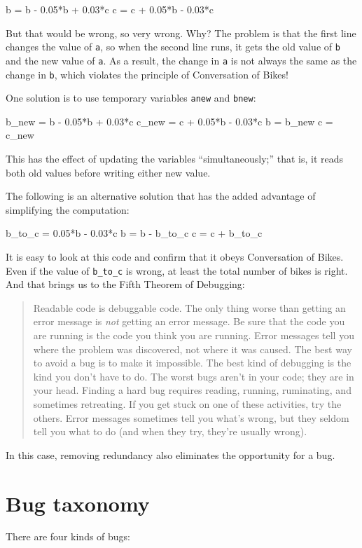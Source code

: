 \documentclass[
]{book}
\numberwithin{Answer}{chapter}
\numberwithin{Exercise}{chapter}
\newcommand{\displaythrm}[1]{%
    \ifthenelse{\equal{#1}{1}}%
        {Readable code is debuggable code.}{%
    \ifthenelse{\equal{#1}{2}}%
        {The only thing worse than getting an error message is {\em
         not} getting an error message.}{%
    \ifthenelse{\equal{#1}{3}}%
        {Be sure that the code you are running
         is the code you think you are running.}{%
    \ifthenelse{\equal{#1}{4}}%
        {Error messages tell you where the problem was discovered,
         not where it was caused.}{%
    \ifthenelse{\equal{#1}{5}}%
        {The best way to avoid a bug is to make it impossible.}{%
    \ifthenelse{\equal{#1}{6}}%
        {The best kind of debugging is the kind you don't have to do.}{%
    \ifthenelse{\equal{#1}{7}}%
        {The worst bugs aren't in your code; they are in your head.}{%
    \ifthenelse{\equal{#1}{8}}%
        {Finding a hard bug requires reading, running, ruminating,
         and sometimes retreating.  If you get stuck on one of these
         activities, try the others.}{%
    \ifthenelse{\equal{#1}{9}}%
        {Error messages sometimes tell you what's wrong, but they
         seldom tell you what to do (and when they try, they're usually
         wrong).}{%
    {}%
}}}}}}}}}}%
\begin{document}
\begin{code}
b = b - 0.05*b + 0.03*c
c = c + 0.05*b - 0.03*c
\end{code}

But that would be wrong, so very wrong.  Why?  The problem is that
the first line changes the value of {\tt a}, so when the second line
runs, it gets the old value of {\tt b} and the new value of {\tt a}.
As a result, the change in {\tt a} is not always the same as the
change in {\tt b}, which violates the principle of Conversation
of Bikes!

One solution is to use temporary variables {\tt anew} and {\tt bnew}:

\begin{code}
b_new = b - 0.05*b + 0.03*c
c_new = c + 0.05*b - 0.03*c
b = b_new
c = c_new
\end{code}

This has the effect of updating the variables ``simultaneously;'' that
is, it reads both old values before writing either new value.

The following is an alternative solution that
has the added advantage of simplifying the computation:

\begin{code}
b_to_c = 0.05*b - 0.03*c
b = b - b_to_c
c = c + b_to_c
\end{code}


It is easy to look at this code and confirm that it obeys Conversation
of Bikes.  Even if the value of \verb"b_to_c" is wrong, at least the total
number of bikes is right.  And that brings us to the Fifth Theorem of
Debugging:

\begin{quote}
\displaythrm{5}
\end{quote}

In this case, removing redundancy also eliminates the opportunity for
a bug.


\section{Bug taxonomy}

There are four kinds of bugs:
\end{document}

